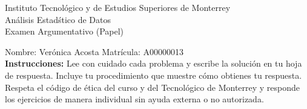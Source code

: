 \documentclass[10pt]{report}
\begin{document}
\newpage



\begin{center}
{\large Instituto Tecnol\'{o}gico y de Estudios Superiores de Monterrey \\
An\'alisis Estad\'stico de Datos } \\
Examen Argumentativo (Papel)
\end{center}

Nombre: \underline{\hspace*{.2in}}
Verónica Acosta
\underline{\hspace*{.2in}} \quad Matr\'icula:\underline{\hspace*{.2in}}
A00000013
\underline{\hspace*{.2in}} \\

{\bf Instrucciones:} Lee con cuidado cada problema y escribe la soluci\'on
en tu hoja de respuesta. Incluye tu procedimiento que muestre c\'omo obtienes tu respuesta.  Respeta el c\'odigo de \'etica del curso y del Tecnol\'ogico de Monterrey y responde los ejercicios de manera individual sin ayuda externa o no autorizada.
\end{document}
